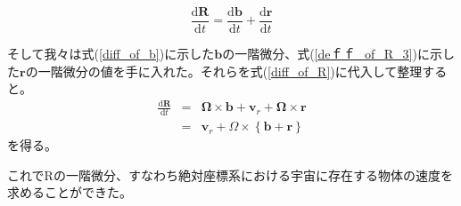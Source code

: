 \documentclass[twocolumn,a4j,10pt]{jarticle}
\begin{document}
\begin{equation}
  \frac{\mathrm{d} \bm{R}}{\mathrm{d} t} = \frac{\mathrm{d} \bm{b}}{\mathrm{d} t} + \frac{\mathrm{d} \bm{r}}{\mathrm{d} t} \nonumber
\end{equation}

そして我々は式(\ref{diff_of_b})に示した$\bm{b}$の一階微分、式(\ref{deｆｆ_of_R_3})に示した$\bm{r}$の一階微分の値を手に入れた。それらを式(\ref{diff_of_R})に代入して整理すると。
\begin{eqnarray}
  \frac{\mathrm{d} \bm{R}}{\mathrm{d} t} &=& \bm{\Omega} \times \bm{b} + \bm{v}_r + \bm{\Omega} \times \bm{r} \nonumber \\
  &=& \bm{v}_r + \Omega \times \left\{ \bm{b} + \bm{r} \right\}
　\label{diff_of_R_6}
\end{eqnarray}
を得る。

これでRの一階微分、すなわち絶対座標系における宇宙に存在する物体の速度を求めることができた。
\end{document}
